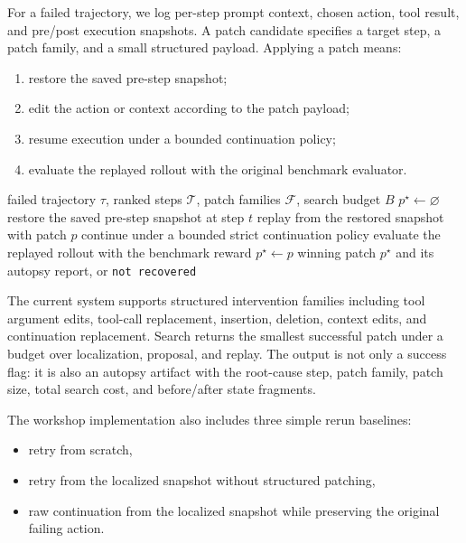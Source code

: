 \documentclass[11pt]{article}
\begin{document}
For a failed trajectory, we log per-step prompt context, chosen action, tool
result, and pre/post execution snapshots. A patch candidate specifies a target
step, a patch family, and a small structured payload. Applying a patch means:
\begin{enumerate}
  \item restore the saved pre-step snapshot;
  \item edit the action or context according to the patch payload;
  \item resume execution under a bounded continuation policy;
  \item evaluate the replayed rollout with the original benchmark evaluator.
\end{enumerate}

\begin{algorithm}[t]
\caption{Minimal Patch Recovery via Checkpointed Replay}
\label{alg:minimal_patch_recovery}
\begin{algorithmic}[1]
\Require failed trajectory $\tau$, ranked steps $\mathcal{T}$, patch families $\mathcal{F}$, search budget $B$
\State $p^\star \gets \varnothing$
  \State restore the saved pre-step snapshot at step $t$
      \State replay from the restored snapshot with patch $p$
      \State continue under a bounded strict continuation policy
      \State evaluate the replayed rollout with the benchmark reward
          \State $p^\star \gets p$
        \EndIf
      \EndIf
    \EndFor
  \EndFor
\EndFor
\State \Return winning patch $p^\star$ and its autopsy report, or \texttt{not recovered}
\end{algorithmic}
\end{algorithm}

The current system supports structured intervention families including tool
argument edits, tool-call replacement, insertion, deletion, context edits, and
continuation replacement. Search returns the smallest successful patch under a
budget over localization, proposal, and replay. The output is not only a
success flag: it is also an autopsy artifact with the root-cause step, patch
family, patch size, total search cost, and before/after state fragments.

The workshop implementation also includes three simple rerun baselines:
\begin{itemize}
  \item retry from scratch,
  \item retry from the localized snapshot without structured patching,
  \item raw continuation from the localized snapshot while preserving the
  original failing action.
\end{itemize}
\end{document}
